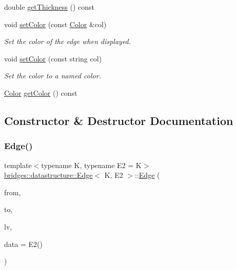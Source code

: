 \begin{DoxyCompactItemize}
double \mbox{\hyperlink{classbridges_1_1datastructure_1_1_edge_a6163e53061d4785b969fa664dbae104b}{get\+Thickness}} () const
\item 
void \mbox{\hyperlink{classbridges_1_1datastructure_1_1_edge_a9eab71fed936587b2a3109d3df3c46fb}{set\+Color}} (const \mbox{\hyperlink{classbridges_1_1datastructure_1_1_color}{Color}} \&col)
\begin{DoxyCompactList}\small\item\em Set the color of the edge when displayed. \end{DoxyCompactList}\item 
void \mbox{\hyperlink{classbridges_1_1datastructure_1_1_edge_a5a38f46e9662624af4de9fcf596c4783}{set\+Color}} (const string col)
\begin{DoxyCompactList}\small\item\em Set the color to a named color. \end{DoxyCompactList}\item 
\mbox{\hyperlink{classbridges_1_1datastructure_1_1_color}{Color}} \mbox{\hyperlink{classbridges_1_1datastructure_1_1_edge_abb5c66b734e1ac71e5d4e012908ec7a4}{get\+Color}} () const
\end{DoxyCompactItemize}


\subsection{Constructor \& Destructor Documentation}
\mbox{\label{classbridges_1_1datastructure_1_1_edge_aae44cef647b20d260b449a5fb041ae95}} 
\subsubsection{\texorpdfstring{Edge()}{Edge()}}
{\footnotesize\ttfamily template$<$typename K, typename E2 = K$>$ \\
\mbox{\hyperlink{classbridges_1_1datastructure_1_1_edge}{bridges\+::datastructure\+::\+Edge}}$<$ K, E2 $>$\+::\mbox{\hyperlink{classbridges_1_1datastructure_1_1_edge}{Edge}} (\begin{DoxyParamCaption}\item[{const K \&}]{from,  }\item[{const K \&}]{to,  }\item[{\mbox{\hyperlink{classbridges_1_1datastructure_1_1_link_visualizer}{Link\+Visualizer}} $\ast$}]{lv,  }\item[{const E2 \&}]{data = {\ttfamily E2()} }\end{DoxyParamCaption})\hspace{0.3cm}{\ttfamily [inline]}}



